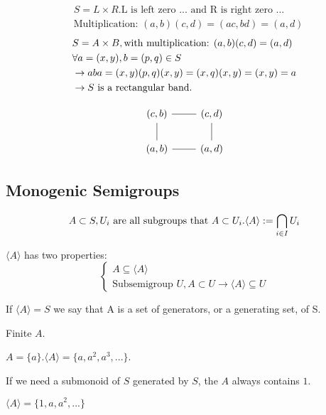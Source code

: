 \begin{Them}
\begin{Prof}
        \begin{align*}
            &S=L\times R.\text{L is left zero ... and R is right zero ...}  \\
            &\text{Multiplication: } (a,b)(c,d)=(ac,bd)=(a,d)
        \end{align*}
        \begin{align*}
            &S=A\times B, \text{with multiplication: }(a,b)(c,d)=(a,d)\\
            &\forall a=(x,y),b=(p,q)\in S   \\
            &\rightarrow aba=(x,y)(p,q)(x,y)=(x,q)(x,y)=(x,y)=a \\
            &\rightarrow S\text{\space is a rectangular band.}
        \end{align*}
    \end{Prof}
    \[\begin{tikzcd}
        (c,b)
            \arrow[r, dash]
            \arrow[d, dash] &
        (c,d)
            \arrow[d, dash] \\
        (a,b)
            \arrow[r, dash] &
        (a,d)
    \end{tikzcd}\]

\end{Them}

\subsection[2]{Monogenic Semigroups}

\begin{Sym}
    \[
        A \subset S, U_i \text{\space are all subgroups that }A \subset U_i.\langle A \rangle:=\bigcap_{i \in I}U_i
    \]
    
    $\langle A \rangle$ has two properties:
    \[\begin{cases}
        A \subseteq \langle A\rangle    \\
        \text{Subsemigroup } U, A\subset U \rightarrow \langle A\rangle \subseteq U
    \end{cases}\]

    If $\langle A\rangle = S$ we say that A is a set of generators, or a generating set, of S.
\end{Sym}

\begin{Exap}
    Finite $A$.

    $A=\{a\}. \langle A\rangle=\{a,a^2,a^3,...\}$.

    If we need a submonoid of $S$ generated by $S$, the $A$ always contains $1$.

    $\langle A \rangle=\{1,a,a^2,...\}$
\end{Exap}

